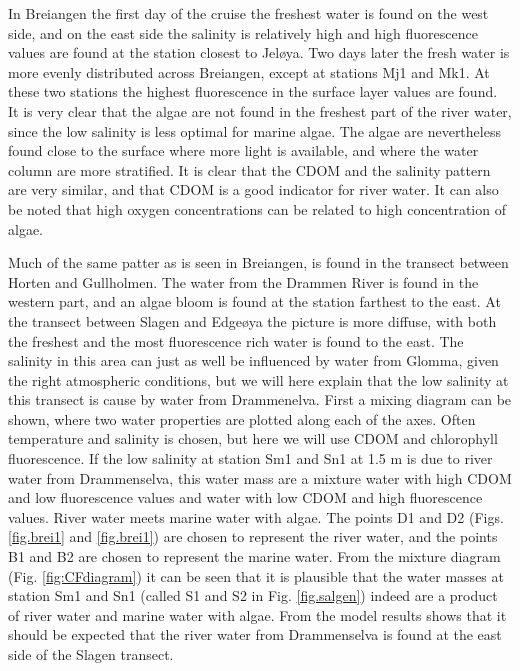 \documentclass[12pt,a4paper,english]{article}
\begin{document}
In Breiangen the first day of the cruise the freshest water is found on the west 
side, and on the east side the salinity is relatively high and high fluorescence 
values are found at the station closest to Jel{\o}ya. 
Two days later the fresh water is more evenly distributed across Breiangen, 
except at stations Mj1 and Mk1. At these two stations the highest fluorescence 
in the surface layer values are found. It is very clear that the algae are not 
found in the freshest part of the river water, since the low salinity is less 
optimal for marine algae. The algae are nevertheless found close to the surface 
where more light is available, and where the water column are more stratified. 
It is clear that the CDOM and the salinity pattern are very similar, and that 
CDOM is a good indicator for river water. It can also be noted that high oxygen 
concentrations can be related to high concentration of algae. 

Much of the same patter as is seen in Breiangen, is found in the transect 
between Horten and Gullholmen. The water from the Drammen River is found in 
the western part, and an algae bloom is found at the station farthest to the east. 
At the transect between Slagen and Edge{\o}ya the picture is more diffuse, with both 
the freshest and the most fluorescence rich water is found to the east. 
The salinity in this area can just as well be influenced by water from Glomma, 
given the right atmospheric conditions, but we will here explain that the low 
salinity at this transect is cause by water from Drammenelva. 
First a mixing diagram can be shown, where two water properties are plotted 
along each of the axes. Often temperature and salinity is chosen, 
but here we will use CDOM and chlorophyll fluorescence. 
If the low salinity at station Sm1 and Sn1 at 1.5 m is due to river water from 
Drammenselva, this water mass are a mixture water with high CDOM and low 
fluorescence values and water with low CDOM and high fluorescence values. 
River water meets marine water with algae. 
The points D1 and D2 (Figs. \ref{fig.brei1} and \ref{fig.brei1}) are chosen to 
represent the river water, 
and the points B1 and B2 are chosen to represent the marine water. 
From the mixture diagram (Fig. \ref{fig:CFdiagram}) it can be seen that it is 
plausible that the water masses at station Sm1 and Sn1 
(called S1 and S2 in Fig. \ref{fig.salgen}) indeed are a 
product of river water and marine water with algae. 
From the model results shows that it should be expected that the river 
water from Drammenselva is found at the east side of the Slagen transect. 
\end{document}
